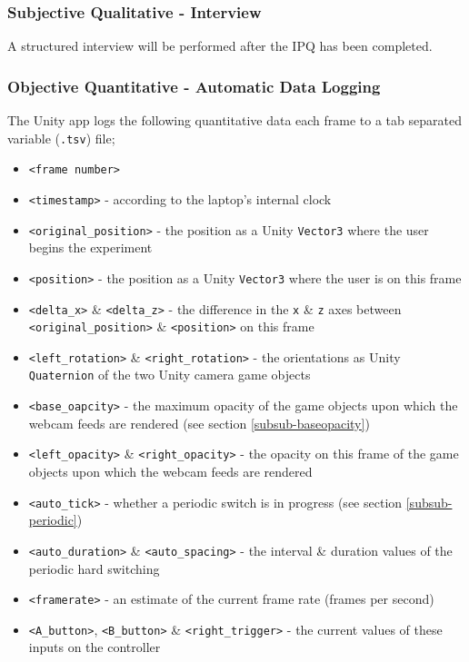 \subsubsection{Subjective Qualitative - Interview}
A structured interview will be performed after the IPQ has been completed.

\subsubsection{Objective Quantitative - Automatic Data Logging}
The Unity app logs the following quantitative data each frame to a tab separated variable (\texttt{.tsv}) file;

\begin{itemize}
	\item \texttt{<frame number>}
	\item \texttt{<timestamp>} - according to the laptop's internal clock
	\item \texttt{<original\_position>} - the position as a Unity \texttt{Vector3} where the user begins the experiment
	\item \texttt{<position>} - the position as a Unity \texttt{Vector3} where the user is on this frame
	\item \texttt{<delta\_x>} \& \texttt{<delta\_z>} - the difference in the \texttt{x} \& \texttt{z} axes between \texttt{<original\_position>} \& \texttt{<position>} on this frame
	\item \texttt{<left\_rotation>} \& \texttt{<right\_rotation>} - the orientations as Unity \texttt{Quaternion} of the two Unity camera game objects
	\item \texttt{<base\_oapcity>} - the maximum opacity of the game objects upon which the webcam feeds are rendered (see section \ref{subsub-baseopacity})
	\item \texttt{<left\_opacity>} \& \texttt{<right\_opacity>} - the opacity on this frame of the game objects upon which the webcam feeds are rendered
	\item \texttt{<auto\_tick>} - whether a periodic switch is in progress (see section \ref{subsub-periodic})
	\item \texttt{<auto\_duration>} \& \texttt{<auto\_spacing>} - the interval \& duration values of the periodic hard switching
	\item \texttt{<framerate>} - an estimate of the current frame rate (frames per second)
	\item \texttt{<A\_button>}, \texttt{<B\_button>} \& \texttt{<right\_trigger>} - the current values of these inputs on the controller
\end{itemize}

